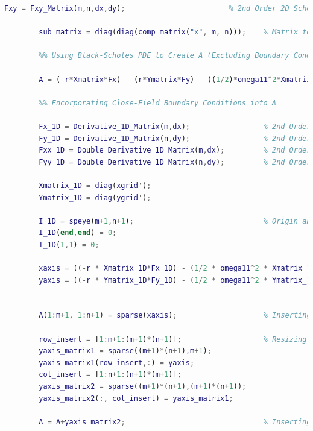 \documentclass[12pt,letterpaper]{article}
\begin{document}
\begin{lstlisting}[language = Matlab]
        Fxy = Fxy_Matrix(m,n,dx,dy);                        % 2nd Order 2D Scheme for Mixed Derivative with Respect to X and Y
        
        sub_matrix = diag(diag(comp_matrix("x", m, n)));    % Matrix to Subtract from speye so All Boundary Conditions in A are Zero
        
        %% Using Black-Scholes PDE to Create A (Excluding Boundary Conditions)
        
        A = (-r*Xmatrix*Fx) - (r*Ymatrix*Fy) - ((1/2)*omega11^2*Xmatrix*Xmatrix * Fxx) - ((1/2)*omega11^2*Ymatrix*Ymatrix * Fyy) - (omega12^2*Xmatrix*Ymatrix*Fxy) + (r*(speye((m+1)*(n+1))-sub_matrix));
        
        %% Encorporating Close-Field Boundary Conditions into A
        
        Fx_1D = Derivative_1D_Matrix(m,dx);                 % 2nd Order 1D Scheme for First Derivative with Respect to X
        Fy_1D = Derivative_1D_Matrix(n,dy);                 % 2nd Order 1D Scheme for First Derivative with Respect to Y
        Fxx_1D = Double_Derivative_1D_Matrix(m,dx);         % 2nd Order 1D Scheme for Second Derivative with Respect to X
        Fyy_1D = Double_Derivative_1D_Matrix(n,dy);         % 2nd Order 1D Scheme for Second Derivative with Respect to Y
        
        Xmatrix_1D = diag(xgrid');
        Ymatrix_1D = diag(ygrid');
        
        I_1D = speye(m+1,n+1);                              % Origin and Far-Field Boundary Conditions Are Later Addressed
        I_1D(end,end) = 0;
        I_1D(1,1) = 0;
        
        xaxis = ((-r * Xmatrix_1D*Fx_1D) - (1/2 * omega11^2 * Xmatrix_1D*Xmatrix_1D * Fxx_1D) + r*I_1D);
        yaxis = ((-r * Ymatrix_1D*Fy_1D) - (1/2 * omega11^2 * Ymatrix_1D*Ymatrix_1D * Fyy_1D) + r*I_1D);
        
        
        A(1:m+1, 1:n+1) = sparse(xaxis);                    % Inserting Close-Field Boundary Condition for X-Axis into A
        
        row_insert = [1:m+1:(m+1)*(n+1)];                   % Resizing Y to be Inserted Into A Matrix
        yaxis_matrix1 = sparse((m+1)*(n+1),m+1);
        yaxis_matrix1(row_insert,:) = yaxis;
        col_insert = [1:n+1:(n+1)*(m+1)];
        yaxis_matrix2 = sparse((m+1)*(n+1),(m+1)*(n+1));
        yaxis_matrix2(:, col_insert) = yaxis_matrix1;
        
        A = A+yaxis_matrix2;                                % Inserting Close-Field Boundary Condition for Y-Axis into A
        

\end{lstlisting}
\end{document}
